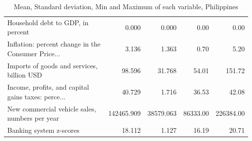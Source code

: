 \documentclass[11pt]{article}
\begin{document}
\begin{table}[H]
\begin{tabular}{lrrrr}
Household debt to GDP, in percent                  &       0.000 &      0.000 &      0.00 &       0.00 \\
Inflation: percent change in the Consumer Price... &       3.136 &      1.363 &      0.70 &       5.20 \\
Imports of goods and services, billion USD         &      98.596 &     31.768 &     54.01 &     151.72 \\
Income, profits, and capital gains taxes: perce... &      40.729 &      1.716 &     36.53 &      42.08 \\
New commercial vehicle sales, numbers per year     &  142465.909 &  38579.063 &  86333.00 &  226384.00 \\
Banking system z-scores                            &      18.112 &      1.127 &     16.19 &      20.71 \\
\bottomrule
\end{tabular}
\caption{Mean, Standard deviation, Min and Maximum of each variable, Philippines}
\label{tab:describe_phl}
\end{table}
\end{document}
